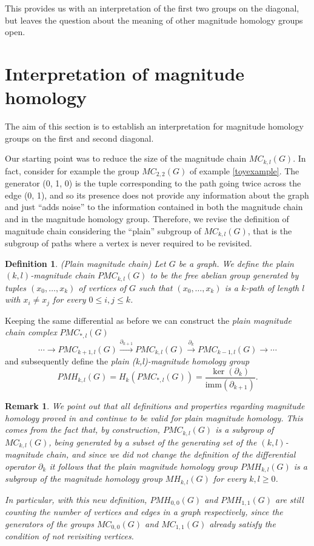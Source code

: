 \documentclass{article}
\newtheorem{definition}[theorem]{Definition}
\newtheorem{remark}[theorem]{Remark}
\newcommand{\imm}{\mathrm{imm}}
\begin{document}
	This provides us with an interpretation of the first two groups on the diagonal, but leaves the question about the meaning of other magnitude homology groups open.
	
	\section{Interpretation of magnitude homology}
	
	The aim of this section is to establish an interpretation for magnitude homology groups on the first and second diagonal.
	
	Our starting point was to reduce the size of the magnitude chain $MC_{k,l}(G)$. 
	In fact, consider for example the group $MC_{2,2}(G)$ of example \ref{toyexample}.
	The generator (0, 1, 0) is the tuple corresponding to the path going twice across the edge (0, 1), and so its presence does not provide any information about the graph and just ``adds noise'' to the information contained in both the magnitude chain and in the magnitude homology group.
	Therefore, we revise the definition of magnitude chain considering the ``plain'' subgroup of $MC_{k,l}(G)$, that is the subgroup of paths where a vertex is never required to be revisited.
	
	\begin{definition}(Plain magnitude chain)
		Let $G$ be a graph.
		We define the plain $(k,l)$-magnitude chain $PMC_{k,l}(G)$ to be the free abelian group generated by tuples $(x_0,\dots,x_k)$ of vertices of $G$ such that $(x_0,\dots,x_k)$ is a $k$-path of length $l$ with $x_i \neq x_j$ for every $0\leq i,j \leq k$.
	\end{definition}
	
	Keeping the same differential as before we can construct the \emph{plain magnitude chain complex} $PMC_{*,l}(G)$
	\[
	\cdots \to PMC_{k+1,l}(G) \xrightarrow{\partial_{k+1}} PMC_{k,l}(G) \xrightarrow{\partial_{k}} PMC_{k-1,l}(G) \to \cdots
	\]
	and subsequently define the \emph{plain (k,l)-magnitude homology group}
	\[
	PMH_{k,l}(G) = H_k(PMC_{*,l}(G)) = \frac{\ker(\partial_k)}{\imm(\partial_{k+1})}.
	\]
	
	\begin{remark}
		\label{PMHsubgroup}
		We point out that all definitions and properties regarding magnitude homology proved in \cite{hepworth2015categorifying} and \cite{leinster2021magnitude} continue to be valid for plain magnitude homology.
		This comes from the fact that, by construction, $PMC_{k,l}(G)$ is a subgroup of $MC_{k,l}(G)$, being generated by a subset of the generating set of the $(k,l)$-magnitude chain, and since we did not change the definition of the differential operator $\partial_k$ it follows that the plain magnitude homology group $PMH_{k,l}(G)$ is a subgroup of the magnitude homology group $MH_{k,l}(G)$ for every $k,l\geq 0$.
		
		In particular, with this new definition, $PMH_{0,0}(G)$ and $PMH_{1,1}(G)$ are still counting the number of vertices and edges in a graph respectively, since the generators of the groups $MC_{0,0}(G)$ and $MC_{1,1}(G)$ already satisfy the condition of not revisiting vertices.
	\end{remark}
	
\end{document}
